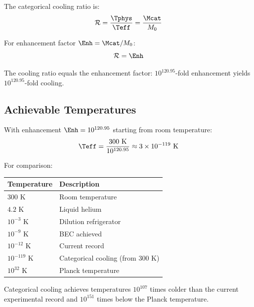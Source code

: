 \begin{definition}
The categorical cooling ratio is:
\begin{equation}
\mathcal{R} = \frac{\Tphys}{\Teff} = \frac{\Mcat}{M_0}
\end{equation}
\end{definition}

\begin{proposition}
For enhancement factor $\Enh = \Mcat/M_0$:
\begin{equation}
\mathcal{R} = \Enh
\end{equation}
\end{proposition}

The cooling ratio equals the enhancement factor: $10^{120.95}$-fold enhancement yields $10^{120.95}$-fold cooling.

\subsection{Achievable Temperatures}

\begin{corollary}
\label{cor:temp_limits}
With enhancement $\Enh = 10^{120.95}$ starting from room temperature:
\begin{equation}
\Teff = \frac{300 \text{ K}}{10^{120.95}} \approx 3 \times 10^{-119} \text{ K}
\end{equation}
\end{corollary}

For comparison:
\begin{center}
\begin{tabular}{ll}
\toprule
Temperature & Description \\
\midrule
$300$ K & Room temperature \\
$4.2$ K & Liquid helium \\
$10^{-3}$ K & Dilution refrigerator \\
$10^{-9}$ K & BEC achieved \\
$10^{-12}$ K & Current record \\
$10^{-119}$ K & Categorical cooling (from 300 K) \\
$10^{32}$ K & Planck temperature \\
\bottomrule
\end{tabular}
\end{center}

Categorical cooling achieves temperatures $10^{107}$ times colder than the current experimental record and $10^{151}$ times below the Planck temperature.

